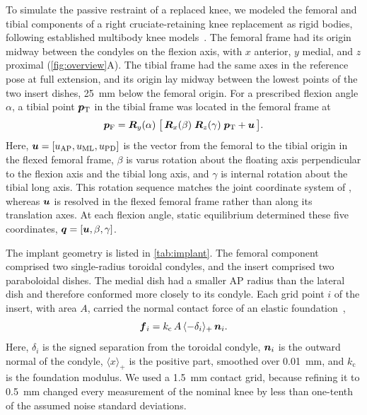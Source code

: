 To simulate the passive restraint of a replaced knee, we modeled the femoral and tibial components of a right cruciate-retaining knee replacement as rigid bodies, following established multibody knee models~\autocite{wismans1980three,blankevoort1991articular,bei2004multibody}.
The femoral frame had its origin midway between the condyles on the flexion axis, with $x$ anterior, $y$ medial, and $z$ proximal (\autoref{fig:overview}A).
The tibial frame had the same axes in the reference pose at full extension, and its origin lay midway between the lowest points of the two insert dishes, \SI{25}{\milli\meter} below the femoral origin.
For a prescribed flexion angle $\alpha$, a tibial point $\mbox{\boldmath $p$}{}_\mathrm{T}$ in the tibial frame was located in the femoral frame at
\begin{equation}
\mbox{\boldmath $p$}{}_\mathrm{F} = \mbox{\boldmath $R$}{}_y(\alpha)\;\bigl[\,\mbox{\boldmath $R$}{}_x(\beta)\;\mbox{\boldmath $R$}{}_z(\gamma)\;\mbox{\boldmath $p$}{}_\mathrm{T} + \mbox{\boldmath $u$}{}\,\bigr].
\label{eq:pose}
\end{equation}
Here, $\mbox{\boldmath $u$}{} = [u_\mathrm{AP}, u_\mathrm{ML}, u_\mathrm{PD}]$ is the vector from the femoral to the tibial origin in the flexed femoral frame, $\beta$ is varus rotation about the floating axis perpendicular to the flexion axis and the tibial long axis, and $\gamma$ is internal rotation about the tibial long axis.
This rotation sequence matches the joint coordinate system of \textcite{grood1983joint}, whereas $\mbox{\boldmath $u$}{}$ is resolved in the flexed femoral frame rather than along its translation axes.
At each flexion angle, static equilibrium determined these five coordinates, $\mbox{\boldmath $q$}{} = [\mbox{\boldmath $u$}{}, \beta, \gamma]$.

The implant geometry is listed in \autoref{tab:implant}.
The femoral component comprised two single-radius toroidal condyles, and the insert comprised two paraboloidal dishes.
The medial dish had a smaller AP radius than the lateral dish and therefore conformed more closely to its condyle.
Each grid point $i$ of the insert, with area $A$, carried the normal contact force of an elastic foundation~\autocite{blankevoort1991articular,bei2004multibody},
\begin{equation}
\mbox{\boldmath $f$}{}_i = k_\mathrm{c}\,A\,\langle -\delta_i \rangle_+\,\mbox{\boldmath $n$}{}_i.
\label{eq:contact}
\end{equation}
Here, $\delta_i$ is the signed separation from the toroidal condyle, $\mbox{\boldmath $n$}{}_i$ is the outward normal of the condyle, $\langle x\rangle_+$ is the positive part, smoothed over \SI{0.01}{\milli\meter}, and $k_\mathrm{c}$ is the foundation modulus.
We used a \SI{1.5}{\milli\meter} contact grid, because refining it to \SI{0.5}{\milli\meter} changed every measurement of the nominal knee by less than one-tenth of the assumed noise standard deviations.


